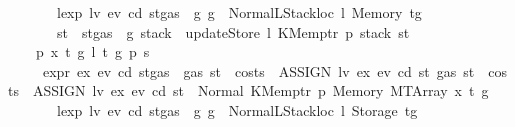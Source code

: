 \begin{isabellebody}
\ \ \ \ \ \ \ {\isachardoublequoteopen}lexp\ lv\ ev\ cd\ {\isacharparenleft}{\kern0pt}st{\isasymlparr}gas\ {\isacharcolon}{\kern0pt}{\isacharequal}{\kern0pt}\ g{\isasymrparr}{\isacharparenright}{\kern0pt}\ g\ {\isacharequal}{\kern0pt}\ Normal{\isacharparenleft}{\kern0pt}{\isacharparenleft}{\kern0pt}LStackloc\ l{\isacharcomma}{\kern0pt}\ Memory\ t{\isacharprime}{\kern0pt}{\isacharparenright}{\kern0pt}{\isacharcomma}{\kern0pt}g{\isacharprime}{\kern0pt}{\isacharparenright}{\kern0pt}{\isachardoublequoteclose}\isanewline
\ \ \ \ \ \ \ {\isachardoublequoteopen}st{\isacharprime}{\kern0pt}\ {\isacharequal}{\kern0pt}\ st{\isasymlparr}gas\ {\isacharcolon}{\kern0pt}{\isacharequal}{\kern0pt}\ g{\isacharprime}{\kern0pt}{\isacharcomma}{\kern0pt}\ stack\ {\isacharcolon}{\kern0pt}{\isacharequal}{\kern0pt}\ updateStore\ l\ {\isacharparenleft}{\kern0pt}KMemptr\ p{\isacharparenright}{\kern0pt}\ {\isacharparenleft}{\kern0pt}stack\ st{\isacharparenright}{\kern0pt}{\isasymrparr}{\isachardoublequoteclose}\isanewline
\ \ {\isacharbar}{\kern0pt}\ {\isacharparenleft}{\kern0pt}{}{\isacharparenright}{\kern0pt}\ p\ x\ t\ g\ l\ t{\isacharprime}{\kern0pt}\ g{\isacharprime}{\kern0pt}\ p{\isacharprime}{\kern0pt}\ s\isanewline
\ \ \ \ \ {\isachardoublequoteopen}expr\ ex\ ev\ cd\ {\isacharparenleft}{\kern0pt}st{\isasymlparr}gas\ {\isacharcolon}{\kern0pt}{\isacharequal}{\kern0pt}\ gas\ st\ {\isacharminus}{\kern0pt}\ costs\ \ {\isacharparenleft}{\kern0pt}ASSIGN\ lv\ ex{\isacharparenright}{\kern0pt}\ ev\ cd\ st{\isasymrparr}{\isacharparenright}{\kern0pt}\ {\isacharparenleft}{\kern0pt}gas\ st\ {\isacharminus}{\kern0pt}\ costs\ \ {\isacharparenleft}{\kern0pt}ASSIGN\ lv\ ex{\isacharparenright}{\kern0pt}\ ev\ cd\ st{\isacharparenright}{\kern0pt}\ {\isacharequal}{\kern0pt}\ Normal\ {\isacharparenleft}{\kern0pt}{\isacharparenleft}{\kern0pt}KMemptr\ p{\isacharcomma}{\kern0pt}\ Memory\ {\isacharparenleft}{\kern0pt}MTArray\ x\ t{\isacharparenright}{\kern0pt}{\isacharparenright}{\kern0pt}{\isacharcomma}{\kern0pt}\ g{\isacharparenright}{\kern0pt}{\isachardoublequoteclose}\isanewline
\ \ \ \ \ \ \ {\isachardoublequoteopen}lexp\ lv\ ev\ cd\ {\isacharparenleft}{\kern0pt}st{\isasymlparr}gas\ {\isacharcolon}{\kern0pt}{\isacharequal}{\kern0pt}\ g{\isasymrparr}{\isacharparenright}{\kern0pt}\ g\ {\isacharequal}{\kern0pt}\ Normal{\isacharparenleft}{\kern0pt}{\isacharparenleft}{\kern0pt}LStackloc\ l{\isacharcomma}{\kern0pt}\ Storage\ t{\isacharprime}{\kern0pt}{\isacharparenright}{\kern0pt}{\isacharcomma}{\kern0pt}g{\isacharprime}{\kern0pt}{\isacharparenright}{\kern0pt}{\isachardoublequoteclose}\isanewline

\end{isabellebody}
